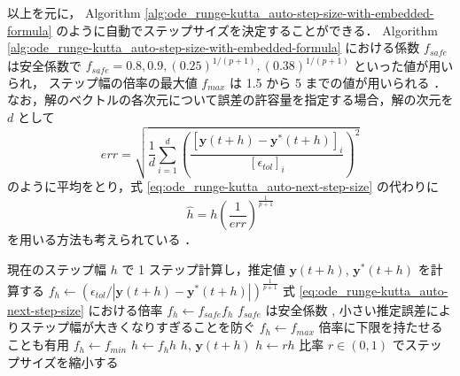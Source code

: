 以上を元に，
Algorithm \ref{alg:ode_runge-kutta_auto-step-size-with-embedded-formula}
のように自動でステップサイズを決定することができる．
Algorithm \ref{alg:ode_runge-kutta_auto-step-size-with-embedded-formula}
における係数 $f_{safe}$ は安全係数で
$f_{safe} = 0.8, 0.9, (0.25)^{1/(p+1)}, (0.38)^{1/(p+1)}$
といった値が用いられ，
ステップ幅の倍率の最大値 $f_{max}$ は
1.5 から 5 までの値が用いられる
\cite[Section II.4]{Hairer1993}．
なお，解のベクトルの各次元について誤差の許容量を指定する場合，解の次元を $d$ として
\begin{equation}
    err = \sqrt{\frac{1}{d} \sum_{i=1}^d \left(\frac{[\bm{y}(t + h) - \bm{y}^*(t + h)]_i}{[\epsilon_{tol}]_i} \right)^2}
    \label{eq:ode_runge-kutta_auto-next-step-size-multi-dimension-error}
\end{equation}
のように平均をとり，式 \eqref{eq:ode_runge-kutta_auto-next-step-size} の代わりに
\begin{equation}
    \hat{h} = h
    \left(\frac{1}{err}\right)^{\frac{1}{p+1}}
    \label{eq:ode_runge-kutta_auto-next-step-size-multi-dimension}
\end{equation}
を用いる方法も考えられている
\cite[Section II.4]{Hairer1993}．

\begin{algorithm}[tp]
    \caption{式 \eqref{eq:ode_runge-kutta_auto-next-step-size} を利用したステップサイズの自動決定 %
        \cite[4.1 節 (a)]{Mitsui1993}, \cite[Section II.4]{Hairer1993}}
    \label{alg:ode_runge-kutta_auto-step-size-with-embedded-formula}
    \begin{algorithmic}
        \Loop
        \State 現在のステップ幅 $h$ で 1 ステップ計算し，推定値 $\bm{y}(t + h)$, $\bm{y}^*(t+h)$ を計算する
        \State $f_{h} \gets \left(\epsilon_{tol} / \left| \bm{y}(t + h) - \bm{y}^*(t + h) \right|\right)^{\frac{1}{p+1}}$
        \Comment 式 \eqref{eq:ode_runge-kutta_auto-next-step-size} における倍率
        \State $f_h \gets f_{safe} f_h$
        \Comment $f_{safe}$ は安全係数 \cite[4.1 節 (a)]{Mitsui1993}, \cite[Section II.4]{Hairer1993}
        \Comment 小さい推定誤差によりステップ幅が大きくなりすぎることを防ぐ \cite[Section II.4]{Hairer1993}
        \State $f_h \gets f_{max}$
        \EndIf
        \Comment 倍率に下限を持たせることも有用 \cite[Section II.4]{Hairer1993}
        \State $f_h \gets f_{min}$
        \EndIf
        \State $h \gets f_h h$
        \State \Return $h$, $\bm{y}(t + h)$
        \EndIf
        \State $h \gets r h$ \Comment 比率 $r \in (0, 1)$ でステップサイズを縮小する
        \EndLoop
        \EndProcedure
    \end{algorithmic}
\end{algorithm}

